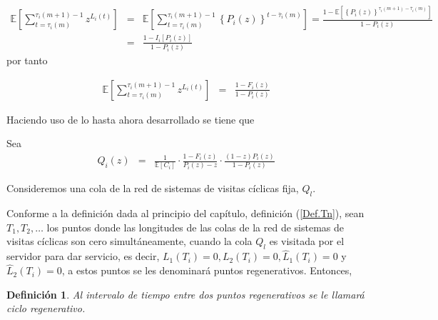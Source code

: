 \documentclass{article}
\newtheorem{Def}{Definición}
\newcommand{\esp}{\mathbb{E}}
\begin{document}
\begin{eqnarray*}
\esp\left[\sum_{t=\tau_{i}\left(m\right)}^{\tau_{i}\left(m+1\right)-1}z^{L_{i}\left(t\right)}\right]&=&\esp\left[\sum_{t=\tau_{i}\left(m\right)}^{\tau_{i}\left(m+1\right)-1}\left\{P_{i}\left(z\right)\right\}^{t-\overline{\tau}_{i}\left(m\right)}\right]=\frac{1-\esp\left[\left\{P_{i}\left(z\right)\right\}^{\tau_{i}\left(m+1\right)-\overline{\tau}_{i}\left(m\right)}\right]}{1-P_{i}\left(z\right)}\\
&=&\frac{1-I_{i}\left[P_{i}\left(z\right)\right]}{1-P_{i}\left(z\right)}
\end{eqnarray*}
por tanto

\begin{eqnarray*}
\esp\left[\sum_{t=\tau_{i}\left(m\right)}^{\tau_{i}\left(m+1\right)-1}z^{L_{i}\left(t\right)}\right]&=&\frac{1-F_{i}\left(z\right)}{1-P_{i}\left(z\right)}
\end{eqnarray*}

Haciendo uso de lo hasta ahora desarrollado se tiene que



Sea 
\begin{eqnarray*}
Q_{i}\left(z\right)&=&\frac{1}{\esp\left[C_{i}\right]}\cdot\frac{1-F_{i}\left(z\right)}{P_{i}\left(z\right)-z}\cdot\frac{\left(1-z\right)P_{i}\left(z\right)}{1-P_{i}\left(z\right)}
\end{eqnarray*}

Consideremos una cola de la red de sistemas de visitas c\'iclicas fija, $Q_{l}$.


Conforme a la definici\'on dada al principio del cap\'itulo, definici\'on (\ref{Def.Tn}), sean $T_{1},T_{2},\ldots$ los puntos donde las longitudes de las colas de la red de sistemas de visitas c\'iclicas son cero simult\'aneamente, cuando la cola $Q_{l}$ es visitada por el servidor para dar servicio, es decir, $L_{1}\left(T_{i}\right)=0,L_{2}\left(T_{i}\right)=0,\hat{L}_{1}\left(T_{i}\right)=0$ y $\hat{L}_{2}\left(T_{i}\right)=0$, a estos puntos se les denominar\'a puntos regenerativos. Entonces, 

\begin{Def}
Al intervalo de tiempo entre dos puntos regenerativos se le llamar\'a ciclo regenerativo.
\end{Def}
\end{document}

